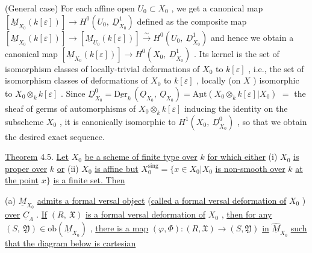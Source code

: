(General case)  For each affine open  $U_{0} \subset X_{0}$ , we get a canonical map $[\underline{M}_{X_{0}}(k[\varepsilon])] \to H^{0}(U_{0},\ \underline{D}^{1}_{X_{0}})$  defined as the composite map $[\underline{M}_{X_{0}}(k[\varepsilon])] \to [\underline{M}_{U_{0}}(k[\varepsilon])] \overset{\sim}{\longrightarrow} H^{0}(U_{0},\ \underline{D}^{1}_{X_{0}})$  and hence we obtain a canonical map $[\underline{M}_{X_{0}}(k[\varepsilon])] \to H^{0}(X_{0},\ \underline{D}^{1}_{X_{0}})$ . Its kernel is the set of isomorphism classes of locally-trivial deformations of  $X_{0}$  to  $k[\varepsilon]$ , i.e., the set of isomorphism classes of deformations of  $X_{0}$  to  $k[\varepsilon]$ , locally (on $X$ ) isomorphic to $X_{0} \otimes_{k} k[\varepsilon]$ . Since  $\underline{D}^{0}_{X_{0}} = \underline{\mathrm{Der}}_{k}\,(\underline{O}_{X_{0}},\ \underline{O}_{X_{0}}) = \underline{\mathrm{Aut}}(X_{0} \otimes_{k} k[\varepsilon]|X_{0})$  $=$ the sheaf of germs of automorphisms of  $X_{0} \otimes_{k} k[\varepsilon]$  inducing the identity on the subscheme $X_{0}$ , it is canonically isomorphic to  $H^{1}(X_{0},\ \underline{D}^{0}_{X_{0}})$ , so that we obtain the desired exact sequence.

\underline{Theorem} 4.5.  \underline{Let} $X_{0}$ \underline{be a scheme of finite type over} $k$ \underline{for which either} (i) $X_{0}$ \underline{is proper over} $k$ \underline{or} (ii) $X_{0}$ \underline{is affine but} $X_{0}^{\mathrm{sing}} = \{x \in X_{0}|X_{0}$ \underline{is non-smooth over} $k$ \underline{at the point} $x \}$ \underline{is a finite set. Then}

(a)  $\underline{M}_{X_{0}}$  \underline{admits a formal versal object} (\underline{called a formal versal deformation of}  $X_{0}$ ) \underline{over}  $\underline{C}_{\Lambda}$ . \underline{If}  $(R,\ \mathfrak{X})$  \underline{is a formal versal deformation of}  $X_{0}$ , \underline{then for any} $(S,\ \mathfrak{Y}) \in \mathrm{ob}(\widehat{\underline{M}}_{X_{0}})$ , \underline{there is a map}  $(\varphi,\Phi) : (R,\mathfrak{X}) \to (S,\mathfrak{Y})$  \underline{in}  $\widehat{\underline{M}}_{X_{0}}$  \underline{such that the diagram below is cartesian}

